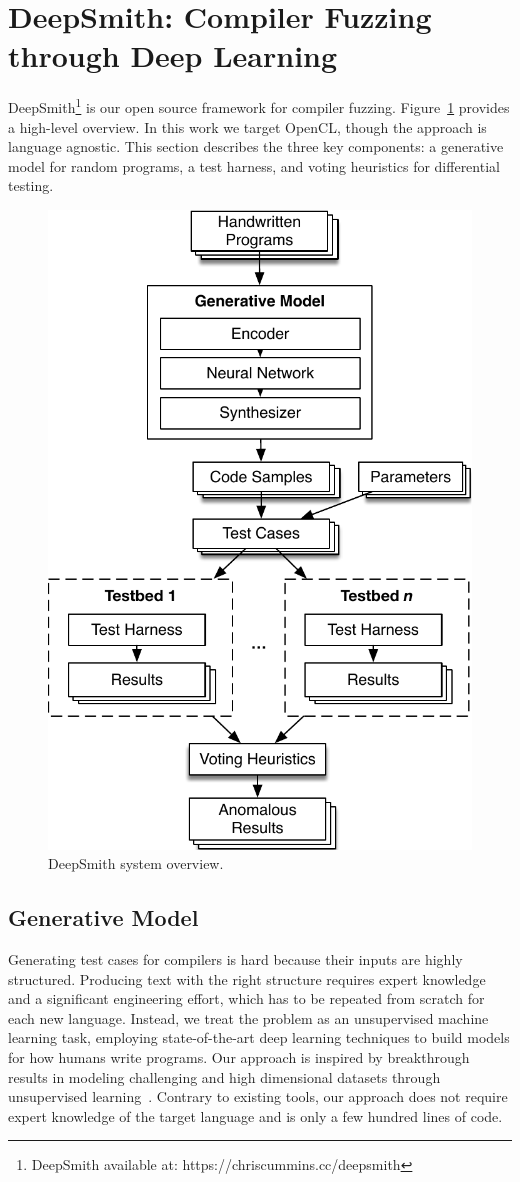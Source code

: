 \section{DeepSmith: Compiler Fuzzing through Deep Learning}

DeepSmith\footnote{DeepSmith available at: https://chriscummins.cc/deepsmith} is
our open source framework for compiler fuzzing. Figure~\ref{fig:deeptune}
provides a high-level overview. In this work we target OpenCL, though the
approach is language agnostic. This section describes the three key components:
a generative model for random programs, a test harness, and voting heuristics
for differential testing.

\begin{figure}
  \centering
  \includegraphics[width=.55\columnwidth]{img/deepsmith}
  \caption{%
  DeepSmith system overview.
  }%
  \label{fig:deeptune}
\end{figure}

\subsection{Generative Model}

Generating test cases for compilers is hard because their inputs are highly
structured. Producing text with the right structure requires expert knowledge
and a significant engineering effort, which has to be repeated from scratch for
each new language. Instead, we treat the problem as an unsupervised machine
learning task, employing state-of-the-art deep learning techniques to build
models for how humans write programs. Our approach is inspired by breakthrough
results in modeling challenging and high dimensional datasets through
unsupervised learning~\cite{Raghu2016,Radford2016b,Bowman2015}. Contrary to
existing tools, our approach does not require expert knowledge of the target
language and is only a few hundred lines of code.

